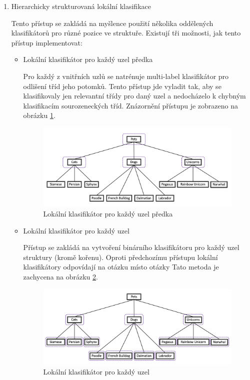 \documentclass[thesis=M,czech]{FITthesis}[2019/12/23]
\begin{document}
\begin{enumerate}
    \item Hierarchicky strukturovaná lokální klasifikace
    
    Tento přístup se zakládá na myšlence použití několika oddělených klasifikátorů pro různé pozice ve struktuře. Existují tři možnosti, jak tento přístup implementovat:
    \begin{itemize}
        \item Lokální klasifikátor pro každý uzel předka
        
        Pro každý z vnitřních uzlů se natrénuje multi-label klasifikátor pro odlišení tříd jeho potomků. Tento přístup jde vyladit tak, aby se klasifikovaly jen relevantní třídy pro daný uzel a nedocházelo k chybným klasifikacím sourozeneckých tříd. Znázornění přístupu je zobrazeno na obrázku \ref{fig:weiss2019local1}.
    
        \begin{figure}\centering
        	\includegraphics[width=1\textwidth]{images/weiss2019/hierarchical_class_local1.png}
        	\caption{Lokální klasifikátor pro každý uzel předka\cite{weiss2019}}\label{fig:weiss2019local1}
        \end{figure}
        
        \item Lokální klasifikátor pro každý uzel
        
        Přístup se zakládá na vytvoření binárního klasifikátoru pro každý uzel struktury (kromě kořenu). Oproti předchozímu přístupu lokální klasifikátory odpovídají na otázku  místo otázky  Tato metoda je zachycena na obrázku \ref{fig:weiss2019local2}.
    
        \begin{figure}\centering
        	\includegraphics[width=1\textwidth]{images/weiss2019/hierarchical_class_local2.png}
        	\caption{Lokální klasifikátor pro každý uzel\cite{weiss2019}}\label{fig:weiss2019local2}
        \end{figure}


\end{itemize}
\end{enumerate}
\end{document}
